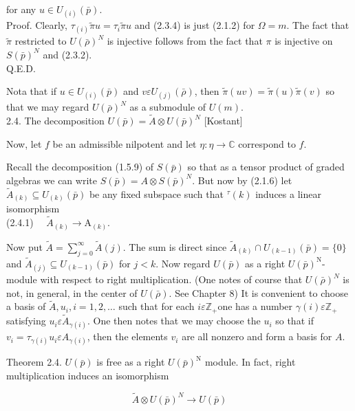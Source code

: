 \documentclass[10pt]{article}
\begin{document}
for any $u \in U_{(i)}(\bar{p})$.\\
Proof. Clearly, $\tau_{(i)} \tilde{\pi} u=\tau_{i} \tilde{\pi} u$ and (2.3.4) is just (2.1.2) for $\Omega=m$. The fact that $\tilde{\pi}$ restricted to $U(\bar{\rho})^{N}$ is injective follows from the fact that $\pi$ is injective on $S(\bar{p})^{N}$ and (2.3.2).\\
Q.E.D.

Nota that if $u \in U_{(i)}(\bar{p})$ and $v \varepsilon U_{(j)}(\bar{\rho})$, then $\tilde{\pi}(u v)=\tilde{\pi}(u) \tilde{\pi}(v)$ so that we may regard $U(\bar{\rho})^{N}$ as a submodule of $U(m)$.\\
2.4. The decomposition $U(\bar{p})=\tilde{A} \otimes U(\bar{p})^{N}$ [Kostant]

Now, let $f$ be an admissible nilpotent and let $\eta: \eta \rightarrow \mathbb{C}$ correspond to $f$.

Recall the decomposition (1.5.9) of $S(\bar{p})$ so that as a tensor product of graded algebras we can write $S(\bar{p})=A \otimes S(\bar{p})^{N}$. But now by (2.1.6) let $\tilde{A}_{(k)} \subseteq U_{(k)}(\bar{p})$ be any fixed subspace such that ${ }^{\tau}(k)$ induces a linear isomorphism\\
(2.4.1) $\quad \tilde{A}_{(k)} \rightarrow \mathrm{A}_{(k)}$.

Now put $\tilde{A}=\sum_{j=0}^{\infty} \tilde{A}(j)$. The sum is direct since $\tilde{A}_{(k)} \cap U_{(k-1)}(\bar{p})=\{0\}$ and $\tilde{A}_{(j)} \subseteq U_{(k-1)}(\bar{p})$ for $j<k$. Now regard $U(\bar{p})$ as a right $U(\bar{p})^{\mathrm{N}}$-module with respect to right multiplication. (One notes of course that $U(\bar{\rho})^{N}$ is not, in general, in the center of $U(\bar{\rho})$. See Chapter 8) It is convenient to choose a basis of $\tilde{A}, u_{i}, i=1,2, \ldots$ such that for each $i \varepsilon \mathbb{Z}_{+}$one has a number $\gamma(i) \varepsilon \mathbb{Z}_{+}$satisfying $u_{i} \varepsilon \tilde{A}_{\gamma(i)}$. One then notes that we may choose the $u_{i}$ so that if $v_{i}=\tau_{\gamma(i)} u_{i} \varepsilon A_{\gamma(i)}$, then the elements $v_{i}$ are all nonzero and form a basis for $A$.

Theorem 2.4. $U(\bar{p})$ is free as a right $U(\bar{p})^{\mathrm{N}}$ module. In fact, right multiplication induces an isomorphism


\begin{equation*}
\tilde{A} \otimes U(\bar{p})^{N} \rightarrow U(\bar{p}) \tag{2.4.2}
\end{equation*}
\end{document}
